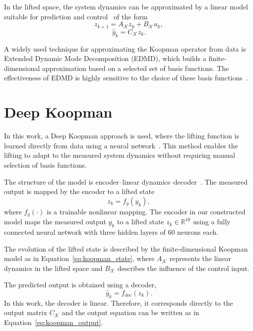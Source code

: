 In the lifted space, the system dynamics can be approximated by a linear model suitable for prediction and control~\cite{korda2018} of the form
\begin{equation}
z_{k+1} = A_{\mathcal{K}} z_k + B_{\mathcal{K}} u_k,
\label{eq:koopman_state}
\end{equation}
\begin{equation}
\hat{y}_k = C_{\mathcal{K}} z_k.
\label{eq:koopman_output}
\end{equation}

A widely used technique for approximating the Koopman operator from data is Extended Dynamic Mode Decomposition (EDMD), which builds a finite-dimensional approximation based on a selected set of basis functions. The effectiveness of EDMD is highly sensitive to the choice of these basis functions \cite{williams2015}.

\section{Deep Koopman}
\label{sec:deep_koopman}

In this work, a Deep Koopman approach is used, where the lifting function is learned directly from data using a neural network~\cite{lusch2018deep,yeung2019learning,otto2019linearly}. This method enables the lifting to adapt to the measured system dynamics without requiring manual selection of basis functions.

The structure of the model is encoder–linear dynamics–decoder~\cite{goodfellow2016deep}. The measured output is mapped by the encoder to a lifted state
\begin{equation}
z_k = f_y(y_k),
\label{eq:koopman_encoder}
\end{equation}
where $f_y(\cdot)$ is a trainable nonlinear mapping. The encoder in our constructed model maps the measured output $y_k$ to a lifted state $z_k \in \mathbb{R}^{10}$ using a fully connected neural network with three hidden layers of 60 neurons each.


The evolution of the lifted state is described by the finite-dimensional Koopman model as in Equation~\eqref{eq:koopman_state}, where $A_{\mathcal K}$ represents the linear dynamics in the lifted space and $B_{\mathcal K}$ describes the influence of the control input.


The predicted output is obtained using a decoder,
\begin{equation}
\hat{y}_k = f_{\mathrm{dec}}(z_k).
\label{eq:koopman_decoder}
\end{equation}
In this work, the decoder is linear. Therefore, it corresponds directly to the output matrix $C_{\mathcal K}$ and the output equation can be written as in Equation~\eqref{eq:koopman_output}.

